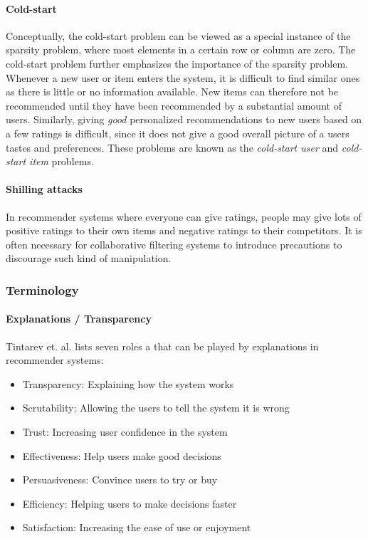 \paragraph{Cold-start}

Conceptually, the cold-start problem can be viewed as a special instance of the
sparsity problem, where most elements in a certain row or column are zero. The
cold-start problem further emphasizes the importance of the sparsity problem.
Whenever a new user or item enters the system, it is difficult to find similar
ones as there is little or no information available. New items can therefore
not be recommended until they have been recommended by a substantial amount of
users. Similarly, giving \emph{good} personalized recommendations to new users
based on a few ratings is difficult, since it does not give a good overall
picture of a users tastes and preferences. These problems are known as the
\emph{cold-start user} and \emph{cold-start item} problems.

\paragraph{Shilling attacks}

In recommender systems where everyone can give ratings, people may give lots of
positive ratings to their own items and negative ratings to their competitors.
It is often necessary for collaborative filtering systems to introduce
precautions to discourage such kind of manipulation.

\subsubsection{Terminology}


\paragraph{Explanations / Transparency}

Tintarev et. al. \cite{Tintarev2007} lists seven roles a that can be played by
explanations in recommender systems:

\begin{itemize}
\item Transparency: Explaining how the system works
\item Scrutability: Allowing the users to tell the system it is wrong
\item Trust: Increasing user confidence in the system
\item Effectiveness: Help users make good decisions
\item Persuasiveness: Convince users to try or buy
\item Efficiency: Helping users to make decisions faster
\item Satisfaction: Increasing the ease of use or enjoyment
\end{itemize}

